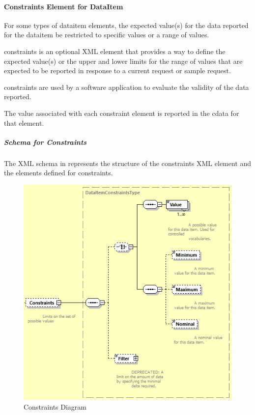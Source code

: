 \documentclass{mtconnect}	%
\providecommand{\DIFdelend}{} %
\begin{document}

\DIFdelend

\paragraph{Constraints Element for DataItem}\mbox{}

For some types of \gls{dataitem} elements, the expected value(s) for the data reported for the \gls{dataitem} \may be restricted to specific values or a range of values.

\gls{constraints} is an optional XML element that provides a way to define the expected value(s) or the upper and lower limits for the range of values that are expected to be reported in response to a \gls{current request} or \gls{sample request}.

\gls{constraints} are used by a software application to evaluate the validity of the data reported.

The value associated with each \gls{constraint} element is reported in the \gls{cdata} for that element.

\subparagraph{Schema for Constraints} \mbox{}

The XML schema in  represents the structure of the \gls{constraints} XML element and the elements defined for \gls{constraints}.

\begin{figure}[ht]
  \centering
  \includegraphics[width=.75\textwidth]{figures/constraints-schema-diagram.png}
  \caption{Constraints Diagram}
  \label{fig:constraints-schema-diagram}
\end{figure}
\FloatBarrier
\end{document}
